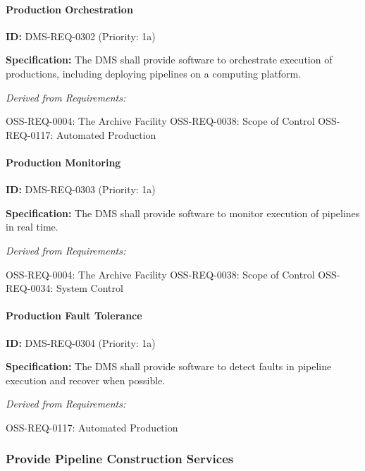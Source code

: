 \documentclass[SE,toc,lsstdraft]{lsstdoc}
\begin{document}
\paragraph{Production Orchestration}\hfill  %

\label{DMS-REQ-0302}
\textbf{ID:} DMS-REQ-0302 (Priority: 1a)

\textbf{Specification:} The DMS shall provide software to orchestrate execution of productions, including deploying pipelines on a computing platform.

\emph{Derived from Requirements:}

OSS-REQ-0004:
The Archive Facility \newline
OSS-REQ-0038:
Scope of Control \newline
OSS-REQ-0117:
Automated Production \newline

\paragraph{Production Monitoring}\hfill  %

\label{DMS-REQ-0303}
\textbf{ID:} DMS-REQ-0303 (Priority: 1a)

\textbf{Specification:} The DMS shall provide software to monitor execution of pipelines in real time.

\emph{Derived from Requirements:}

OSS-REQ-0004:
The Archive Facility \newline
OSS-REQ-0038:
Scope of Control \newline
OSS-REQ-0034:
System Control \newline

\paragraph{Production Fault Tolerance}\hfill  %

\label{DMS-REQ-0304}
\textbf{ID:} DMS-REQ-0304 (Priority: 1a)

\textbf{Specification:} The DMS shall provide software to detect faults in pipeline execution and recover when possible.

\emph{Derived from Requirements:}

OSS-REQ-0117:
Automated Production \newline

\subsubsection{Provide Pipeline Construction Services}
\end{document}
